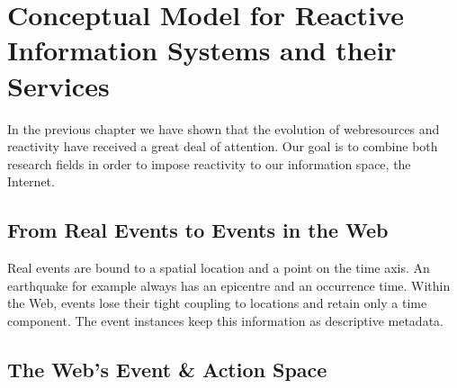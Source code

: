 
\chapter{Conceptual Model for Reactive Information Systems and their Services}

%


In the previous chapter we have shown that the evolution of \textrm{\glspl{webresource}} and reactivity have received a great deal of attention.
Our goal is to combine both research fields in order to impose reactivity to our information space, the Internet. 

\section{From Real Events to Events in the Web}
Real events are bound to a spatial location and a point on the time axis.
An earthquake for example always has an epicentre and an occurrence time.
Within the Web, events lose their tight coupling to locations and retain only a time component.
The event instances keep this information as descriptive metadata.

\section{The Web's Event \& Action Space}

